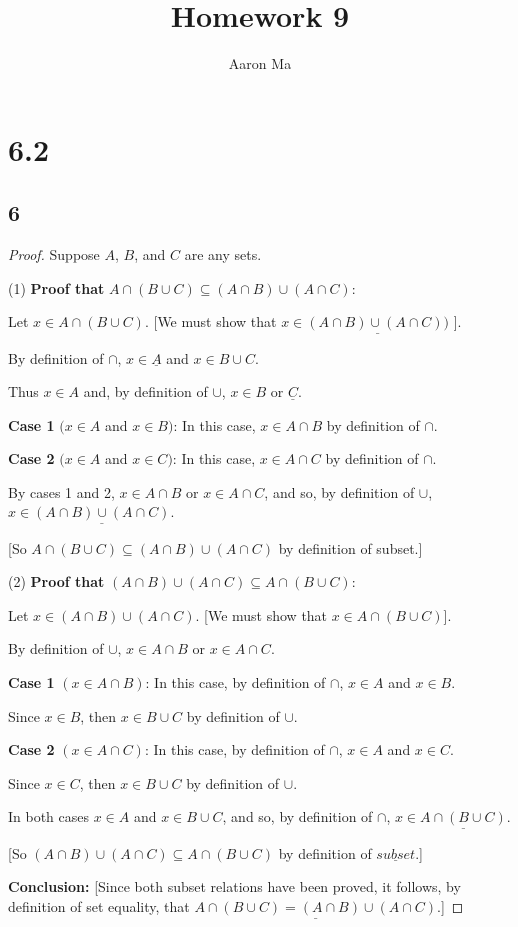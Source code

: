 \documentclass{article}
\title{Homework 9}
\author{Aaron Ma}
\begin{document}
\maketitle

\section{6.2}
\subsection{6}
\begin{proof}
    Suppose $A$, $B$, and $C$ are any sets.

(1) \textbf{Proof that} $A \cap (B \cup C) \subseteq (A \cap B) \cup (A \cap C)$:

Let $x \in A \cap (B \cup C)$. [We must show that $x \in \underline{(A \cap B) \cup (A \cap C))}$ ].

By definition of $\cap$, $x \in \underline{A}$ and $x \in B \cup C$.

Thus $x \in A$ and, by definition of $\cup$, $x \in B$ or $\underline{C}$.

\textbf{Case 1} $(x \in A$ and $x \in B)$: In this case, $x \in A \cap B$ by definition of $\cap$.

\textbf{Case 2} $(x \in A$ and $x \in C)$: In this case, $x \in A \cap C$ by definition of $\cap$.

By cases 1 and 2, $x \in A \cap B$ or $x \in A \cap C$, and so, by definition of $\cup$, $x \in \underline{(A \cap B) \cup (A\cap C)}$.

[So $A \cap (B \cup C) \subseteq (A \cap B) \cup (A \cap C)$ by definition of subset.]

(2) \textbf{Proof that} $(A \cap B) \cup (A \cap C) \subseteq A \cap (B \cup C)$:

Let $x \in (A \cap B) \cup (A \cap C)$. [We must show that $x \in A \cap (B \cup C)$].

By definition of $\cup$, $x \in A \cap B$ or $x \in A \cap C$.

\textbf{Case 1} $(x \in A \cap B)$: In this case, by definition of $\cap$, $x \in A$ and $x \in B$.

Since $x \in B$, then $x \in B \cup C$ by definition of $\cup$.

\textbf{Case 2} $(x \in A \cap C)$: In this case, by definition of $\cap$, $x \in A$ and $x \in C$.

Since $x \in C$, then $x \in B \cup C$ by definition of $\cup$.

In both cases $x \in A$ and $x \in B \cup C$, and so, by definition of $\cap$, $x \in \underline{A \cap (B \cup C)}$.

[So $(A \cap B) \cup (A \cap C) \subseteq A \cap (B \cup C)$ by definition of $\underline{subset}$.]

\textbf{Conclusion:} [Since both subset relations have been proved, it follows, by definition of set equality, that $\underline{A \cap (B \cup C) = (A \cap B) \cup (A \cap C)}$.]

\end{proof}
\end{document}
